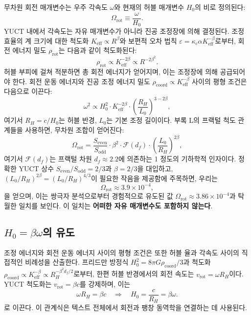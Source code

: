 \documentclass[11pt,a4paper]{article}
\begin{document}
	무차원 회전 매개변수는 우주 각속도 \(\omega\)와 현재의 허블 매개변수 \(H_0\)의 비로 정의된다:
	\begin{equation}
		\Omega_{\mathrm{rot}} \equiv \frac{\omega}{H_0}.
	\end{equation}
	YUCT 내에서 각속도는 자유 매개변수가 아니라 진공 조정장에 의해 결정된다. 조정 효율의 계 크기에 대한 척도화 \(K_{\mathrm{eff}} \propto R^{\beta}\)와 보편적 오차 법칙 \(\varepsilon = \kappa_c \alpha K_{\mathrm{eff}}^{-\beta}\)로부터, 회전 에너지 밀도 \(\rho_{\mathrm{rot}}\)는 다음과 같이 척도화된다:
	\begin{equation}
		\rho_{\mathrm{rot}} \propto K_{\mathrm{eff}}^{-2\beta} \propto R^{-2\beta^2}.
	\end{equation}
	허블 부피에 걸쳐 적분하면 총 회전 에너지가 얻어지며, 이는 조정장에 의해 공급되어야 한다. 회전 운동 에너지와 진공 조정 에너지 밀도 \(\rho_{\mathrm{coord}} \propto K_{\mathrm{eff}}^{-\beta}\) 사이의 평형 조건은 다음으로 이끈다:
	\begin{equation}
		\omega^2 \propto H_0^2 \cdot K_{\mathrm{eff}}^{-2\beta} \cdot \left(\frac{R_H}{L_0}\right)^{3-2\beta},
	\end{equation}
	여기서 \(R_H = c/H_0\)는 허블 반경, \(L_0\)는 기본 조정 길이이다. 부록 L의 프랙털 척도 관계들을 사용하면, 무차원 조합이 얻어진다:
	\begin{equation}
		\Omega_{\mathrm{rot}} = \frac{S_{\mathrm{even}}}{S_{\mathrm{odd}}} \cdot \beta^2 \cdot \mathcal{F}(d_f) \cdot \left(\frac{L_0}{R_H}\right)^{2\beta},
	\end{equation}
	여기서 \(\mathcal{F}(d_f)\)는 프랙털 차원 \(d_f \approx 2.2\)에 의존하는 1 정도의 기하학적 인자이다. 정확한 YUCT 상수 \(S_{\mathrm{even}}/S_{\mathrm{odd}} = 2/3\)과 \(\beta = 2/3\)을 대입하고, \((L_0/R_H)^{2\beta} = (L_0/R_H)^{4/3}\)이 필요한 작음을 제공함에 주목하면, 우리는
	\begin{equation}
		\boxed{\Omega_{\mathrm{rot}} \approx 3.9 \times 10^{-4}},
	\end{equation}
	을 얻으며, 이는 쌍극자 분석으로부터 경험적으로 유도된 값 \(\Omega_{\mathrm{rot}} \approx 3.86 \times 10^{-4}\)과 탁월한 일치를 보인다. 이 일치는 \textbf{어떠한 자유 매개변수도 포함하지 않는다}.
	
	\subsection{\(H_0 = \beta \omega\)의 유도}
	
	조정 에너지와 회전 운동 에너지 사이의 평형 조건은 또한 허블 율과 각속도 사이의 직접적인 비례성을 산출한다. 프리드만 방정식 \(H_0^2 = 8\pi G \rho_{\mathrm{coord}} / 3\)과 척도화 \(\rho_{\mathrm{coord}} \propto K_{\mathrm{eff}}^{-\beta} \propto R_H^{-\beta^2 d_f /2}\)로부터, 한편 허블 반경에서의 회전 속도는 \(v_{\mathrm{rot}} = \omega R_H\)이다. YUCT 척도화는 \(v_{\mathrm{rot}} = \beta c\)를 강제하며, 이는
	\begin{equation}
		\omega R_H = \beta c \quad \Rightarrow \quad H_0 = \frac{c}{R_H} = \beta \omega.
		\label{eq:H0-beta-omega}
	\end{equation}
	로 이끈다. 이 관계식은 텍스트 전체에서 회전과 팽창 동역학을 연결하는 데 사용된다.
	
\end{document}
